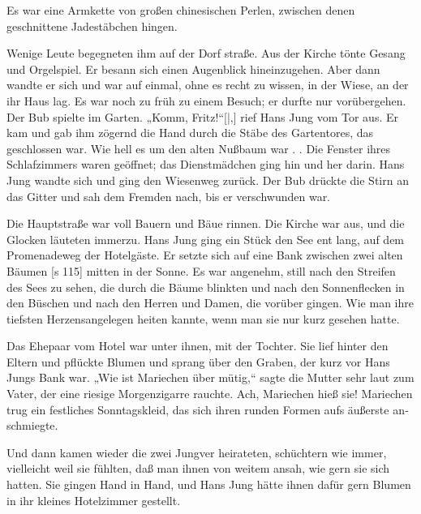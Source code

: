 Es war eine Armkette von großen chinesischen
Perlen, zwischen denen geschnittene Jadestäbchen
hingen.

Wenige Leute begegneten ihm auf der Dorf­
straße. Aus der Kirche tönte Gesang und Orgelspiel.
Er besann sich einen Augenblick hineinzugehen. Aber
dann wandte er sich und war auf einmal, ohne es
recht zu wissen, in der Wiese, an der ihr Haus lag.
Es war noch zu früh zu einem Besuch; er durfte
nur vorübergehen. Der Bub spielte im Garten.
„Komm, Fritz!“[|,] rief Hans Jung vom Tor aus. Er
kam und gab ihm zögernd die Hand durch die Stäbe
des Gartentores, das geschlossen war. Wie hell es
um den alten Nußbaum war . . Die Fenster ihres
Schlafzimmers waren geöffnet; das Dienstmädchen
ging hin und her darin. Hans Jung wandte sich und
ging den Wiesenweg zurück. Der Bub drückte die
Stirn an das Gitter und sah dem Fremden nach, bis
er verschwunden war.

Die Hauptstraße war voll Bauern und Bäue­
rinnen. Die Kirche war aus, und die Glocken läuteten
immerzu. Hans Jung ging ein Stück den See ent­
lang, auf dem Promenadeweg der Hotelgäste. Er
setzte sich auf eine Bank zwischen zwei alten Bäumen
[s 115]
mitten in der Sonne. Es war angenehm, still nach
den Streifen des Sees zu sehen, die durch die Bäume
blinkten und nach den Sonnenflecken in den Büschen
und nach den Herren und Damen, die vorüber­
gingen. Wie man ihre tiefsten Herzensangelegen­
heiten kannte, wenn man sie nur kurz gesehen hatte.

Das Ehepaar vom Hotel war unter ihnen, mit
der Tochter. Sie lief hinter den Eltern und pflückte
Blumen und sprang über den Graben, der kurz vor
Hans Jungs Bank war. „Wie ist Mariechen über­
mütig,“ sagte die Mutter sehr laut zum Vater, der
eine riesige Morgenzigarre rauchte. Ach, Mariechen
hieß sie! Mariechen trug ein festliches Sonntagskleid,
das sich ihren runden Formen aufs äußerste an­
schmiegte.

Und dann kamen wieder die zwei Jungver­
heirateten, schüchtern wie immer, vielleicht weil sie
fühlten, daß man ihnen von weitem ansah, wie gern
sie sich hatten. Sie gingen Hand in Hand, und Hans
Jung hätte ihnen dafür gern Blumen in ihr kleines
Hotelzimmer gestellt.

